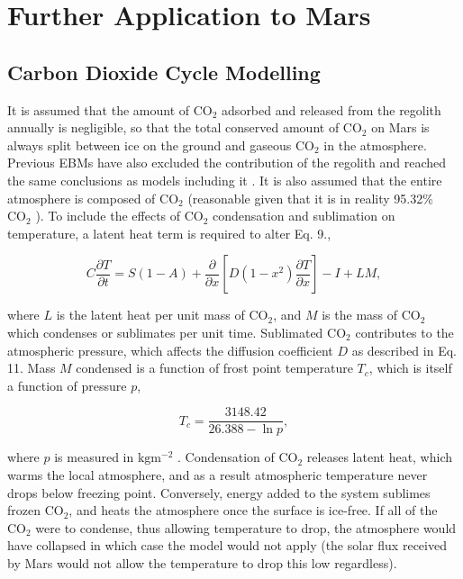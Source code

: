 \documentclass[12pt,onecolumn]{revtex4-2}    %
\begin{document}
\section{Further Application to Mars}
\subsection{Carbon Dioxide Cycle Modelling}

It is assumed that the amount of $\mathrm{CO_2}$ adsorbed and released from the regolith annually is negligible, so that the total conserved amount of $\mathrm{CO_2}$ on Mars is always split between ice on the ground and gaseous $\mathrm{CO_2}$ in the atmosphere. Previous EBMs have also excluded the contribution of the regolith and reached the same conclusions as models including it \cite{NT01}. It is  also assumed that the entire atmosphere is composed of $\mathrm{CO_2}$ (reasonable given that it is in reality 95.32\% $\mathrm{CO_2}$ \cite{JN82}). To include the effects of $\mathrm{CO_2}$ condensation and sublimation on temperature, a latent heat term is required to alter Eq. 9.,  %

\begin{equation}
C \frac{\partial T}{\partial t} = S(1-A) + \frac{\partial}{\partial x} [D(1-x^{2})\frac{\partial T}{\partial x}] - I + LM,
\end{equation}

where $L$ is the latent heat per unit mass of $\mathrm{CO_2}$, and $M$ is the mass of $\mathrm{CO_2}$ which condenses or sublimates per unit time. Sublimated $\mathrm{CO_2}$ contributes to the atmospheric pressure, which affects the diffusion coefficient $D$ as described in Eq. 11. Mass $M$ condensed is a function of frost point temperature $T_{c}$, which is itself a function of pressure $p$,

\begin{equation}
T_{c} = \frac{3148.42}{26.388 - \ln{p}},
\end{equation}

where $p$ is measured in $\mathrm{kg m^{-2}}$ \cite{H54}. Condensation of $\mathrm{CO_2}$ releases latent heat, which warms the local atmosphere, and as a result atmospheric temperature never drops below freezing point. Conversely, energy added to the system sublimes frozen $\mathrm{CO_2}$, and heats the atmosphere once the surface is ice-free. If all of the $\mathrm{CO_2}$ were to condense, thus allowing temperature to drop, the atmosphere would have collapsed in which case the model would not apply (the solar flux received by Mars would not allow the temperature to drop this low regardless).
\end{document}

